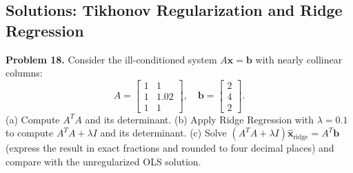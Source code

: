 \documentclass[11pt, letterpaper]{article}
\theoremstyle{definition}
\theoremstyle{remark}
\begin{document}
\subsection{Solutions: Tikhonov Regularization and Ridge Regression}

\textbf{Problem 18.} Consider the ill-conditioned system $A\mathbf{x} = \mathbf{b}$ with nearly collinear columns:
\[
A = \begin{bmatrix} 1 & 1 \\ 1 & 1.02 \\ 1 & 1 \end{bmatrix}, \quad \mathbf{b} = \begin{bmatrix} 2 \\ 4 \\ 2 \end{bmatrix}.
\]
(a) Compute $A^T A$ and its determinant. (b) Apply Ridge Regression with $\lambda = 0.1$ to compute $A^T A + \lambda I$ and its determinant. (c) Solve $(A^T A + \lambda I)\hat{\mathbf{x}}_{\text{ridge}} = A^T \mathbf{b}$ (express the result in exact fractions and rounded to four decimal places) and compare with the unregularized OLS solution.
\end{document}
